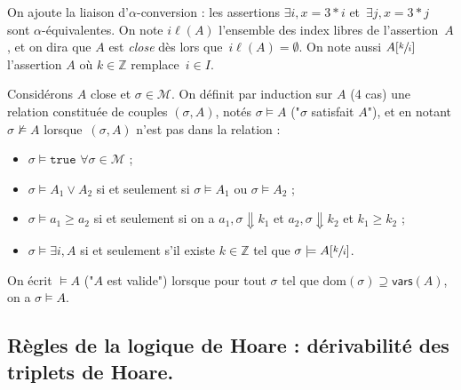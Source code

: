 \documentclass[../main]{subfiles}
\begin{document}
  On ajoute la liaison d'$\alpha$-conversion : les assertions $\exists i, x = 3 * i$ et~$\exists j, x = 3 * j$ sont $\alpha$-équivalentes.
  On note $i\ell(A)$ l'ensemble des index libres de l'assertion~$A$, et on dira que $A$ est \textit{close} dès lors que~$i\ell(A) = \emptyset$.
  On note aussi $A[\sfrac{k}{i}]$ l'assertion $A$ où $k \in \mathds{Z}$ remplace~$i \in I$.

  \begin{defn}
    Considérons $A$ close et $\sigma \in \mathcal{M}$.
    On définit par induction sur $A$ (4 cas) une relation constituée de couples $(\sigma, A)$, notés  $\sigma \models A$ ("$\sigma$ satisfait $A$"), et en notant $\sigma \not\models A$ lorsque~$(\sigma, A)$ n'est pas dans la relation :
    \begin{itemize}
      \item $\sigma \models \mathtt{true}$ $\forall \sigma \in \mathcal{M}$ ;
      \item $\sigma \models A_1 \lor A_2$ si et seulement si $\sigma \models A_1$ ou $\sigma \models A_2$ ;
      \item $\sigma \models a_1 \ge a_2$ si et seulement si on a $a_1, \sigma \Downarrow k_1$ et $a_2, \sigma \Downarrow k_2$ et $k_1 \ge k_2$ ;
      \item $\sigma \models \exists i, A$ si et seulement s'il existe $k \in \mathds{Z}$ tel que $\sigma \models A[\sfrac{k}{i}]$.
    \end{itemize}

    On écrit $\models A$ ("$A$ est valide") lorsque pour tout $\sigma$ tel que $\mathrm{dom}(\sigma) \supseteq \mathsf{vars}(A)$, on a $\sigma \models A$.
  \end{defn}

  \subsection{Règles de la logique de Hoare : dérivabilité des triplets de Hoare.}
\end{document}
